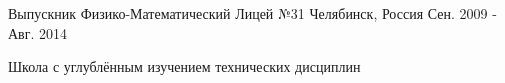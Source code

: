 \begin{cventries}
  \cventry
  {Выпускник} %
  {Физико-Математический Лицей №31} %
  {Челябинск, Россия} %
  {Сен. 2009 - Авг. 2014} %
  {
    \begin{cvitems} %
      \item {Школа с углублённым изучением технических дисциплин}
    \end{cvitems}
  }

\end{cventries}